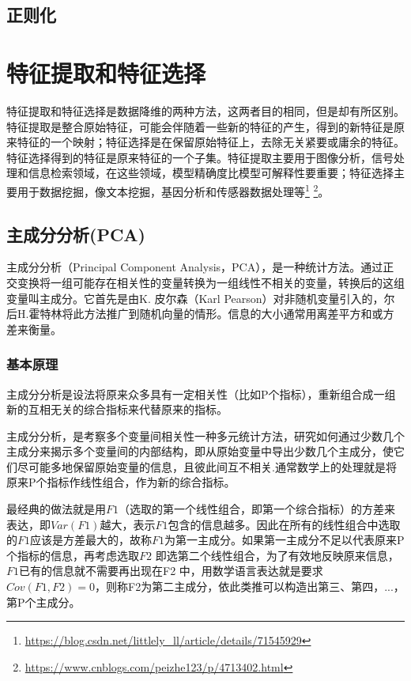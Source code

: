 \subsection{正则化}

\section{特征提取和特征选择}

特征提取和特征选择是数据降维的两种方法，这两者目的相同，但是却有所区别。特征提取是整合原始特征，可能会伴随着一些新的特征的产生，得到的新特征是原来特征的一个映射；特征选择是在保留原始特征上，去除无关紧要或庸余的特征。特征选择得到的特征是原来特征的一个子集。特征提取主要用于图像分析，信号处理和信息检索领域，在这些领域，模型精确度比模型可解释性要重要；特征选择主要用于数据挖掘，像文本挖掘，基因分析和传感器数据处理等\footnote{\url{https://blog.csdn.net/littlely_ll/article/details/71545929}} \footnote{\url{https://www.cnblogs.com/peizhe123/p/4713402.html}}。

\subsection{主成分分析(PCA)}

主成分分析（Principal Component Analysis，PCA），是一种统计方法。通过正交变换将一组可能存在相关性的变量转换为一组线性不相关的变量，转换后的这组变量叫主成分。它首先是由K. 皮尔森（Karl Pearson）对非随机变量引入的，尔后H.霍特林将此方法推广到随机向量的情形。信息的大小通常用离差平方和或方差来衡量。

\subsubsection{基本原理}

主成分分析是设法将原来众多具有一定相关性（比如P个指标），重新组合成一组新的互相无关的综合指标来代替原来的指标。

主成分分析，是考察多个变量间相关性一种多元统计方法，研究如何通过少数几个主成分来揭示多个变量间的内部结构，即从原始变量中导出少数几个主成分，使它们尽可能多地保留原始变量的信息，且彼此间互不相关.通常数学上的处理就是将原来P个指标作线性组合，作为新的综合指标。

最经典的做法就是用$F1$（选取的第一个线性组合，即第一个综合指标）的方差来表达，即$Var(F1)$越大，表示$F1$包含的信息越多。因此在所有的线性组合中选取的$F1$应该是方差最大的，故称$F1$为第一主成分。如果第一主成分不足以代表原来P个指标的信息，再考虑选取$F2$ 即选第二个线性组合，为了有效地反映原来信息，$F1$已有的信息就不需要再出现在F2 中，用数学语言表达就是要求$Cov(F1, F2)=0$，则称F2为第二主成分，依此类推可以构造出第三、第四，...，第P个主成分。

